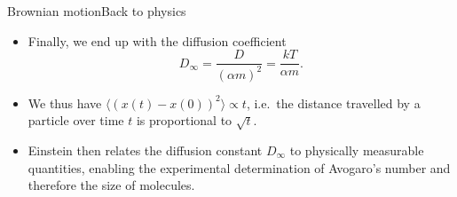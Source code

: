 \documentclass[usenames,dvipsnames,svgnames,10pt,aspectratio=169]{beamer}
\begin{document}
\begin{frame}[t, c]{Brownian motion}{Back to physics}
	\begin{itemize}
		\item Finally, we end up with the diffusion coefficient
		$$
		D_{\infty} = \frac{D}{(\alpha m)^2} = \frac{kT}{\alpha m}.
		$$

		\medskip

		\item We thus have $\langle \left( x(t) - x(0) \right)^2 \rangle \propto t$, i.e.\ the distance travelled by a particle over time $t$ is proportional to $\sqrt{t}$.

		\medskip

		\item Einstein then relates the diffusion constant $D_{\infty}$ to physically measurable quantities, enabling the experimental determination of Avogaro's number and therefore the size of molecules.
	\end{itemize}

	\vspace{1cm}
\end{frame}
\end{document}
